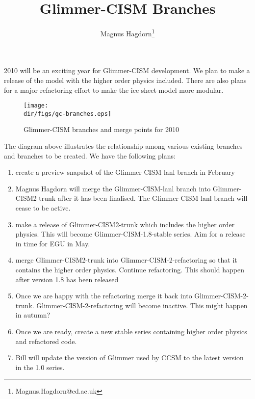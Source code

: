 \documentclass[10pt,english,a4paper]{article}
\newcommand{\dir}{.}
\begin{document}
\title{Glimmer-CISM Branches}
\author{Magnus Hagdorn\thanks{Magnus.Hagdorn@ed.ac.uk}}

\maketitle

2010 will be an exciting year for Glimmer-CISM development. We plan to make a release of the model with the higher order physics included. There are also plans for a major refactoring effort to make the ice sheet model more modular.

\begin{figure}[htbp]
\centering
\texttt{[image: \\dir/figs/gc-branches.eps]}
\caption{Glimmer-CISM branches and merge points for 2010}
\end{figure}

The diagram above illustrates the relationship among various existing branches and branches to be created. We have the following plans:
\begin{enumerate}
\item create a preview snapshot of the Glimmer-CISM-lanl branch in February
\item Magnus Hagdorn will merge the Glimmer-CISM-lanl branch into Glimmer-CISM2-trunk after it has been finalised. The Glimmer-CISM-lanl branch will cease to be active.
\item make a release of Glimmer-CISM2-trunk which includes the higher order physics. This will become Glimmer-CISM-1.8-stable series. Aim for a release in time for EGU in May.
\item merge Glimmer-CISM2-trunk into Glimmer-CISM-2-refactoring so that it contains the higher order physics. Continue refactoring. This should happen after version 1.8 has been released
\item Once we are happy with the refactoring merge it back into Glimmer-CISM-2-trunk. Glimmer-CISM-2-refactoring will become inactive. This might happen in autumn?
\item Once we are ready, create a new stable series containing higher order physics and refactored code.
\item Bill will update the version of Glimmer used by CCSM to the latest version in the 1.0 series.
\end{enumerate}
\end{document}
